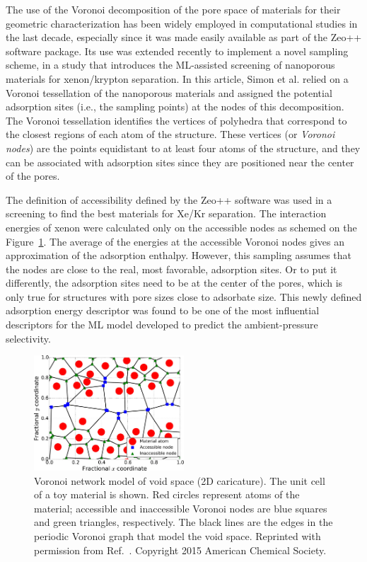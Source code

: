 \documentclass[main]{subfiles}
\begin{document}
The use of the Voronoi decomposition of the pore space of materials for their geometric characterization has been widely employed in computational studies in the last decade,\autocite{Willems_2012}  especially since it was made easily available as part of the Zeo++ software package.\autocite{Pinheiro2013} Its use was extended recently to implement a novel sampling scheme, in a study  that introduces the ML-assisted screening of nanoporous materials for xenon/krypton separation. In this article, Simon et al.\autocite{Simon_2015} relied on a Voronoi tessellation of the nanoporous materials and assigned the potential adsorption sites (i.e., the sampling points) at the nodes of this decomposition. The Voronoi tessellation identifies the vertices of polyhedra that correspond to the closest regions of each atom of the structure. These vertices (or \emph{Voronoi nodes}) are the points equidistant to at least four atoms of the structure, and they can be associated with adsorption sites since they are positioned near the center of the pores. 

The definition of accessibility defined by the Zeo++ software was used in a screening to find the best materials for Xe/Kr separation.\autocite{Simon_2015} The interaction energies of xenon were calculated only on the accessible nodes as schemed on the Figure~\ref{fgr:simon_voro}. The average of the energies at the accessible Voronoi nodes gives an approximation of the adsorption enthalpy. However, this sampling assumes that the nodes are close to the real, most favorable, adsorption sites. Or to put it differently, the adsorption sites need to be at the center of the pores, which is only true for structures with pore sizes close to adsorbate size. This newly defined adsorption energy descriptor was found to be one of the most influential descriptors for the ML model developed to predict the ambient-pressure selectivity. 

\begin{figure}[ht]
  \centering
  \includegraphics[width=0.5\textwidth]{figures/3-fastsim/Simon_voronoi.jpeg}
  \caption{Voronoi network model of void space (2D caricature). The unit cell of a toy material is shown. Red circles represent atoms of the material; accessible and inaccessible Voronoi nodes are blue squares and green triangles, respectively. The black lines are the edges in the periodic Voronoi graph that model the void space. Reprinted with permission from Ref.~\cite{Simon_2015}. Copyright 2015 American Chemical Society.}\label{fgr:simon_voro}
\end{figure}
\end{document}
